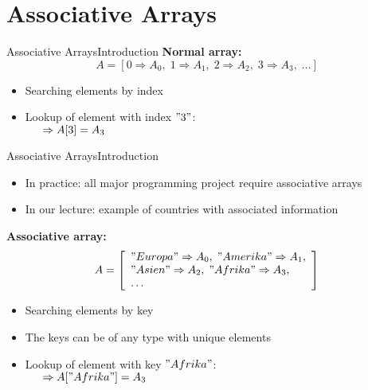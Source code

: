 \section{Associative Arrays}


\begin{frame}{Associative Arrays}{Introduction}
  \textbf{Normal array:}\\
  \begin{displaymath}
    A = [0 \Rightarrow A_0, \; 1 \Rightarrow A_1, \;
      2 \Rightarrow A_2, \; 3 \Rightarrow A_3, \; \dotsc]
  \end{displaymath}
  \begin{itemize}
    \item
      Searching elements by {\color{Mittel-Blau}index}\\
    \item
      Lookup of element with index $"3"$:\\
      $\hspace{1.5em}\Rightarrow A[3] = A_3$
  \end{itemize}
\end{frame}


\begin{frame}{Associative Arrays}{Introduction}
  \begin{itemize}
  \item In practice: all major programming project require associative arrays
  \item In our lecture: example of countries with associated information
  \end{itemize}
  \textbf{Associative array:}\\
  \begin{displaymath}
    A = \left[\begin{array}{l}
      "Europa" \Rightarrow A_0, \; "Amerika" \Rightarrow A_1,\\
      "Asien" \Rightarrow A_2, \; "Afrika" \Rightarrow A_3,\\
      \dotsc
    \end{array}\right]
  \end{displaymath}
  \begin{itemize}
    \item
      Searching elements by {\color{Mittel-Blau}key}\\
    \item
      The keys can be of any type with unique elements
    \item
      Lookup of element with key $"Afrika"$:\\
      $\hspace{1.5em}\Rightarrow A["Afrika"] = A_3$
  \end{itemize}
\end{frame}

